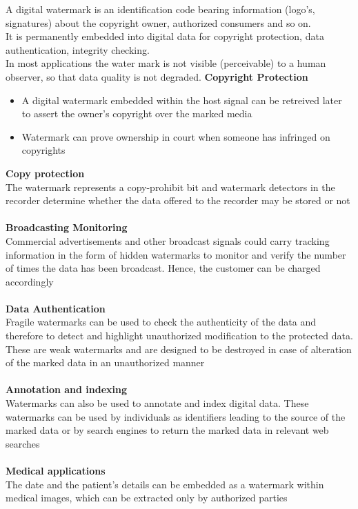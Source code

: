 \documentclass[10pt,a4paper]{book}
\begin{document}
A digital watermark is an identification code bearing information (logo's, signatures) about the copyright owner, authorized consumers and so on. \\
It is permanently embedded into digital data for copyright protection, data authentication, integrity checking. \\
In most applications the water mark is not visible (perceivable) to a human observer, so that data quality is not degraded.
\newpage
\textbf{Copyright Protection }
\begin{itemize}
\item A digital watermark embedded within the host signal can be retreived later to assert the owner's copyright over the marked media 
\item Watermark can prove ownership in court when someone has infringed on copyrights
\end{itemize}
\textbf{Copy protection}\\
The watermark represents a copy-prohibit bit and watermark detectors in the recorder determine whether the data offered to the recorder may be stored or not\\\\
\textbf{Broadcasting Monitoring }\\
Commercial advertisements and other broadcast signals could carry tracking information in the form of hidden watermarks to monitor and verify the number of times the data has been broadcast. Hence, the customer can be charged accordingly\\\\
\textbf{Data Authentication }\\
Fragile watermarks can be used to check the authenticity of the data and therefore to detect and highlight unauthorized modification to the protected data. These are weak watermarks and are designed to be destroyed in case of alteration of the marked data in an unauthorized manner\\\\
\textbf{Annotation and indexing }\\
Watermarks can also be used to annotate and index digital data. These watermarks can be used by individuals as identifiers leading to the source of the marked data or by search engines to return the marked data in relevant web searches \\\\
\textbf{Medical applications }\\
The date and the patient's details can be embedded as a watermark within medical images, which can be extracted only by authorized parties\\\\
\end{document}

